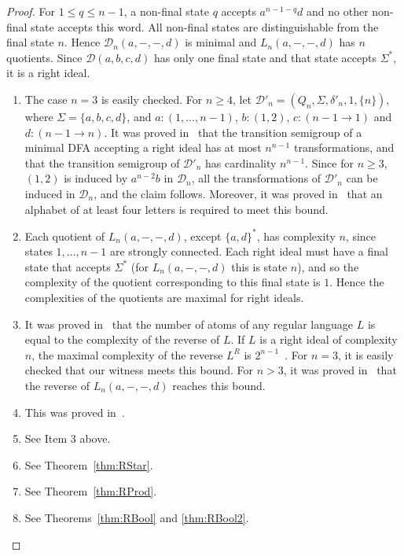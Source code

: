 \documentclass[final]{dmtcs-episciences}
\renewcommand{\le}{\leqslant}
\renewcommand{\ge}{\geqslant}
\newcommand{\Sig}{\Sigma}
\newcommand{\be}{\begin{enumerate}}
\newcommand{\ee}{\end{enumerate}}
\newcommand{\cD}{{\mathcal D}}
\theoremstyle{definition}
\theoremstyle{remark}
\begin{document}
\begin{proof}
For $1\le q \le n-1$, a non-final state $q$ accepts $a^{n-1-q}d$ and no other non-final state accepts this word. All non-final states are distinguishable from the final state $n$. Hence $\cD_n(a,-,-,d)$ is minimal and $L_n(a,-,-,d)$ has $n$ quotients.
Since $\cD(a,b,c,d)$ has only one final state and that state accepts $\Sig^*$, it is a right ideal.
\be
\item
The case $n= 3$ is easily checked. For $n\ge 4$,
let $\cD'_n=(Q_n,\Sig,\delta'_n, 1,\{n\})$, where  $\Sig=\{a,b,c,d\}$, and
$a\colon(1,\ldots,n-1)$, $b\colon (1,2)$, ${c\colon(n-1 \rightarrow 1)}$ and 
${{d\colon(n-1\rightarrow n)}}$.
It was proved in~\cite{BrYe11} that  the transition semigroup of a minimal DFA accepting a right ideal has at most $n^{n-1}$ transformations, and that the transition semigroup of 
$\cD'_n$ has cardinality $n^{n-1}$. 
Since for $n\ge 3$,   $(1,2)$  is induced by  $a^{n-2}b$ in $\cD_n$,
all the transformations of $\cD'_n$ can be induced in $\cD_n$,
and the claim follows.
Moreover, it was proved in~\cite{BSY15} that an alphabet of at least four letters is required to meet this bound. 


\item
Each quotient of $L_n(a,-,-,d)$, except $\{a,d\}^*$, has complexity $n$, since states $1,\ldots, n-1$ are strongly connected.
Each right ideal must have a final state that accepts $\Sig^*$ (for $L_n(a,-,-,d)$ this is state $n$), and so the complexity of the quotient corresponding to this final state is $1$.
Hence the complexities of the quotients are maximal for right ideals.
\item
It was proved  in~\cite{BrTa13} that the number of atoms of any regular language $L$ is equal to the complexity of the reverse of $L$.
If $L$ is a right ideal of complexity $n$, the maximal complexity of the reverse $L^R$ is 
$2^{n-1}$~\cite{BJL13}.
For $n = 3$, it is easily checked that our witness meets this bound.
For $n>3$, it was proved in~\cite{BrYe11} that the reverse of $L_n(a,-,-,d)$ reaches this bound.
\item
This was proved in~\cite{BrDa15}.
\item
See Item 3 above.
\item
See Theorem~\ref{thm:RStar}.
\item
See Theorem~\ref{thm:RProd}.
\item
See Theorems~\ref{thm:RBool} and \ref{thm:RBool2}.  
\ee
\end{proof}
\end{document}
